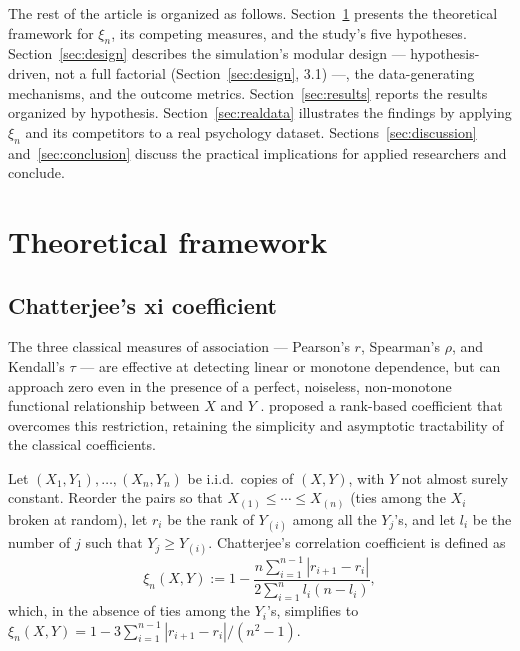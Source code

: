 \documentclass[article]{ajs}
\begin{document}
The rest of the article is organized as follows. Section~\ref{sec:framework}
presents the theoretical framework for $\xi_n$, its competing measures,
and the study's five hypotheses. Section~\ref{sec:design} describes
the simulation's modular design --- hypothesis-driven, not a full
factorial (Section~\ref{sec:design}, 3.1) ---, the data-generating
mechanisms, and the outcome metrics. Section~\ref{sec:results} reports
the results organized by hypothesis. Section~\ref{sec:realdata}
illustrates the findings by applying $\xi_n$ and its competitors to a
real psychology dataset. Sections~\ref{sec:discussion}
and~\ref{sec:conclusion} discuss the practical implications for
applied researchers and conclude.

\section{Theoretical framework} \label{sec:framework}

\subsection{Chatterjee's xi coefficient}

The three classical measures of association --- Pearson's $r$,
Spearman's $\rho$, and Kendall's $\tau$ --- are effective at detecting
linear or monotone dependence, but can approach zero even in the
presence of a perfect, noiseless, non-monotone functional relationship
between $X$ and $Y$ \citep{chatterjee2021}. \cite{chatterjee2021}
proposed a rank-based coefficient that overcomes this restriction,
retaining the simplicity and asymptotic tractability of the classical
coefficients.

Let $(X_1,Y_1), \dots, (X_n,Y_n)$ be i.i.d.\ copies of $(X,Y)$, with
$Y$ not almost surely constant. Reorder the pairs so that
$X_{(1)} \le \cdots \le X_{(n)}$ (ties among the $X_i$ broken at
random), let $r_i$ be the rank of $Y_{(i)}$ among all the $Y_j$'s, and
let $l_i$ be the number of $j$ such that $Y_j \ge Y_{(i)}$. Chatterjee's
correlation coefficient is defined as
\begin{equation} \label{eq:xi}
  \xi_n(X,Y) := 1 - \frac{n \sum_{i=1}^{n-1} |r_{i+1} - r_i|}
                         {2 \sum_{i=1}^{n} l_i (n - l_i)},
\end{equation}
which, in the absence of ties among the $Y_i$'s, simplifies to
$\xi_n(X,Y) = 1 - 3\sum_{i=1}^{n-1}|r_{i+1}-r_i| / (n^2-1)$.
\end{document}
